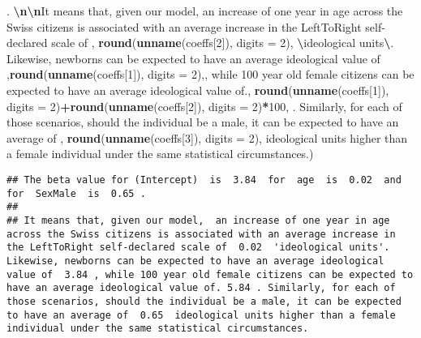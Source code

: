 \documentclass[
]{book}
\newenvironment{Shaded}{\begin{snugshade}}{\end{snugshade}}
\newcommand{\AttributeTok}[1]{\textcolor[rgb]{0.13,0.29,0.53}{#1}}
\newcommand{\DecValTok}[1]{\textcolor[rgb]{0.00,0.00,0.81}{#1}}
\newcommand{\FunctionTok}[1]{\textcolor[rgb]{0.13,0.29,0.53}{\textbf{#1}}}
\newcommand{\NormalTok}[1]{#1}
\newcommand{\SpecialCharTok}[1]{\textcolor[rgb]{0.81,0.36,0.00}{\textbf{#1}}}
\newcommand{\StringTok}[1]{\textcolor[rgb]{0.31,0.60,0.02}{#1}}
\begin{document}
\begin{Shaded}
\begin{Highlighting}[]
\StringTok{\textquotesingle{}. }\SpecialCharTok{\textbackslash{}n\textbackslash{}n}\StringTok{It means that, given our model,  an increase of one year in age across the Swiss citizens is associated with an average increase in the LeftToRight self{-}declared scale of \textquotesingle{}}\NormalTok{, }\FunctionTok{round}\NormalTok{(}\FunctionTok{unname}\NormalTok{(coeffs[}\DecValTok{2}\NormalTok{]), }\AttributeTok{digits =} \DecValTok{2}\NormalTok{), }\StringTok{\textquotesingle{} }\SpecialCharTok{\textbackslash{}\textquotesingle{}}\StringTok{ideological units}\SpecialCharTok{\textbackslash{}\textquotesingle{}}\StringTok{. Likewise, newborns can be expected to have an average ideological value of \textquotesingle{}}\NormalTok{,}\FunctionTok{round}\NormalTok{(}\FunctionTok{unname}\NormalTok{(coeffs[}\DecValTok{1}\NormalTok{]), }\AttributeTok{digits =} \DecValTok{2}\NormalTok{),}\StringTok{\textquotesingle{}, while 100 year old female citizens can be expected to have an average ideological value of.\textquotesingle{}}\NormalTok{, }\FunctionTok{round}\NormalTok{(}\FunctionTok{unname}\NormalTok{(coeffs[}\DecValTok{1}\NormalTok{]), }\AttributeTok{digits =} \DecValTok{2}\NormalTok{)}\SpecialCharTok{+}\FunctionTok{round}\NormalTok{(}\FunctionTok{unname}\NormalTok{(coeffs[}\DecValTok{2}\NormalTok{]), }\AttributeTok{digits =} \DecValTok{2}\NormalTok{)}\SpecialCharTok{*}\DecValTok{100}\NormalTok{, }\StringTok{\textquotesingle{}. Similarly, for each of those scenarios, should the individual be a male, it can be expected to have an average of \textquotesingle{}}\NormalTok{, }\FunctionTok{round}\NormalTok{(}\FunctionTok{unname}\NormalTok{(coeffs[}\DecValTok{3}\NormalTok{]), }\AttributeTok{digits =} \DecValTok{2}\NormalTok{), }\StringTok{\textquotesingle{} ideological units higher than a female individual under the same statistical circumstances.\textquotesingle{}}\NormalTok{)}
\end{Highlighting}
\end{Shaded}

\begin{verbatim}
## The beta value for (Intercept)  is  3.84  for  age  is  0.02  and for  SexMale  is  0.65 . 
## 
## It means that, given our model,  an increase of one year in age across the Swiss citizens is associated with an average increase in the LeftToRight self-declared scale of  0.02  'ideological units'. Likewise, newborns can be expected to have an average ideological value of  3.84 , while 100 year old female citizens can be expected to have an average ideological value of. 5.84 . Similarly, for each of those scenarios, should the individual be a male, it can be expected to have an average of  0.65  ideological units higher than a female individual under the same statistical circumstances.
\end{verbatim}
\end{document}

